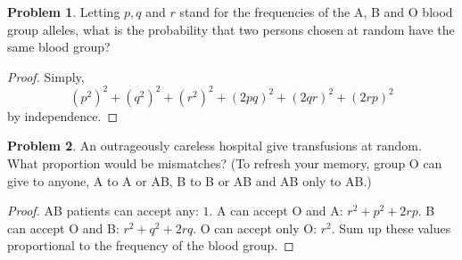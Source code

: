 \documentclass[12pt]{report}
\theoremstyle{definition}
\newtheorem{problem}{Problem}[chapter]
\begin{document}
        \begin{problem}
            Letting $p,q$ and $r$ stand for the frequencies of the A, B and O blood group alleles, what is the probability that two persons chosen at random have the same blood group?
            \begin{proof}
                Simply,
                \begin{equation*}
                    (p^2)^2 + (q^2)^2 + (r^2)^2 + (2pq)^2 + (2qr)^2 + (2rp)^2
                \end{equation*}
                by independence.
            \end{proof}
        \end{problem}

        \begin{problem}
            An outrageously careless hospital give transfusions at random.
            What proportion would be mismatches?
            (To refresh your memory, group O can give to anyone, A to A or AB, B to B or AB and AB only to AB.)
            \begin{proof}
                AB patients can accept any: $1$.
                A can accept O and A: $r^2+p^2+2rp$.
                B can accept O and B: $r^2+q^2+2rq$.
                O can accept only O: $r^2$.
                Sum up these values proportional to the frequency of the blood group.
            \end{proof}
        \end{problem}
        
\end{document}
